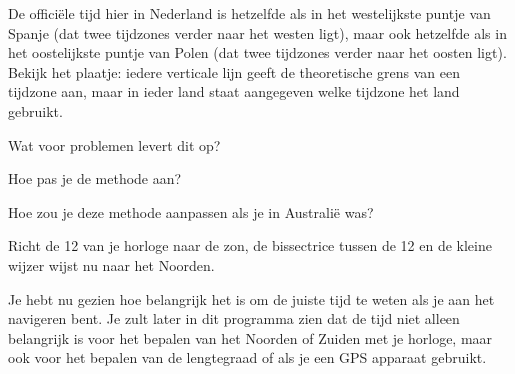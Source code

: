 \begin{opgave}
    De offici\"ele tijd hier in Nederland is hetzelfde als in het westelijkste puntje van Spanje (dat twee tijdzones verder naar het westen ligt), maar ook hetzelfde als in het oostelijkste puntje van Polen (dat twee tijdzones verder naar het oosten ligt). Bekijk het plaatje: iedere verticale lijn geeft de theoretische grens van een tijdzone aan, maar in ieder land staat aangegeven welke tijdzone het land gebruikt. 
    \begin{subopgave}
        Wat voor problemen levert dit op?
    \end{subopgave}
    \begin{subopgave}
        Hoe pas je de methode aan?
    \end{subopgave}
\end{opgave}

\begin{opgave}
    Hoe zou je deze methode aanpassen als je in Australi\"{e} was?
    \begin{antwoord}
        Richt de 12 van je horloge naar de zon, de bissectrice tussen de 12 en de kleine wijzer wijst nu naar het Noorden.
    \end{antwoord}
\end{opgave}

Je hebt nu gezien hoe belangrijk het is om de juiste tijd te weten als je aan het navigeren bent. Je zult later in dit programma zien dat de tijd niet alleen belangrijk is voor het bepalen van het Noorden of Zuiden met je horloge, maar ook voor het bepalen van de lengtegraad of als je een GPS apparaat gebruikt.
